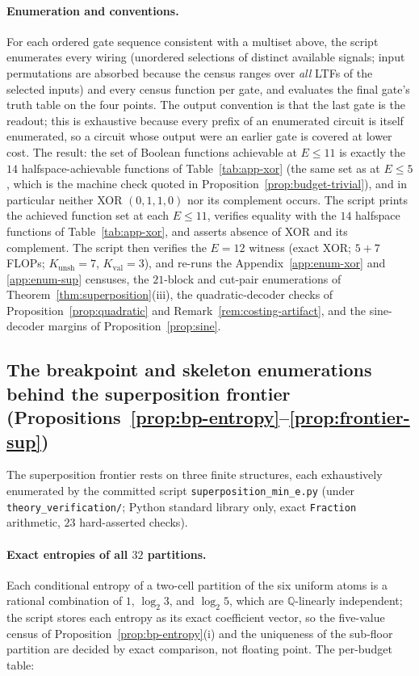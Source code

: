 \documentclass[twocolumn,10pt]{article}
\theoremstyle{definition}
\theoremstyle{remark}
\newcommand{\Kunsh}{K_{\mathrm{unsh}}}
\newcommand{\Kval}{K_{\mathrm{val}}}
\begin{document}
\paragraph{Enumeration and conventions.} For each ordered gate
sequence consistent with a multiset above, the script enumerates every
wiring (unordered selections of distinct available signals; input
permutations are absorbed because the census ranges over \emph{all}
LTFs of the selected inputs) and every census function per gate, and
evaluates the final gate's truth table on the four points. The output
convention is that the last gate is the readout; this is exhaustive
because every prefix of an enumerated circuit is itself enumerated, so
a circuit whose output were an earlier gate is covered at lower cost.
The result: the set of Boolean functions achievable at $E \le 11$ is
exactly the $14$ halfspace-achievable functions of
Table~\ref{tab:app-xor} (the same set as at $E \le 5$, which is the
machine check quoted in Proposition~\ref{prop:budget-trivial}), and
in particular neither XOR $(0,1,1,0)$ nor its complement occurs. The
script prints the achieved function set at each $E \le 11$, verifies
equality with the $14$ halfspace functions of Table~\ref{tab:app-xor},
and asserts absence of XOR and its complement. The
script then verifies the $E = 12$ witness (exact XOR; $5 + 7$ FLOPs;
$\Kunsh = 7$, $\Kval = 3$), and re-runs the
Appendix~\ref{app:enum-xor} and \ref{app:enum-sup} censuses, the
$21$-block and cut-pair enumerations of
Theorem~\ref{thm:superposition}(iii), the quadratic-decoder checks of
Proposition~\ref{prop:quadratic} and
Remark~\ref{rem:costing-artifact}, and the sine-decoder margins of
Proposition~\ref{prop:sine}.

\subsection{The breakpoint and skeleton enumerations behind the
superposition frontier
(Propositions~\ref{prop:bp-entropy}--\ref{prop:frontier-sup})}
\label{app:enum-sup-frontier}

The superposition frontier rests on three finite structures, each
exhaustively enumerated by the committed script
\texttt{superposition\_min\_e.py} (under
\texttt{theory\_verification/}; Python standard library only,
exact \texttt{Fraction} arithmetic, $23$ hard-asserted checks).

\paragraph{Exact entropies of all $32$ partitions.} Each conditional
entropy of a two-cell partition of the six uniform atoms is a rational
combination of $1$, $\log_2 3$, and $\log_2 5$, which are
$\mathbb Q$-linearly independent; the script stores each entropy as its
exact coefficient vector, so the five-value census of
Proposition~\ref{prop:bp-entropy}(i) and the uniqueness of the
sub-floor partition are decided by exact comparison, not floating
point. The per-budget table:
\end{document}
